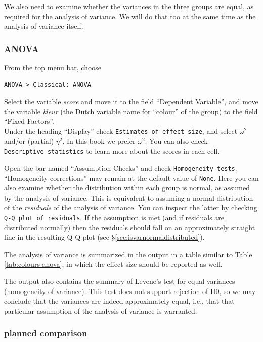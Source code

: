 \documentclass[
]{book}
\begin{document}
We also need to examine whether the variances in the three groups
are equal, as required for the analysis of variance. We will do that too at the same
time as the analysis of variance itself.

\subsubsection{ANOVA}\label{anova-1}

From the top menu bar, choose

\begin{verbatim}
ANOVA > Classical: ANOVA
\end{verbatim}

Select the variable \emph{score} and move it to the field ``Dependent Variable'', and move the variable \emph{kleur} (the Dutch variable name for ``colour'' of the group) to the field ``Fixed Factors''.\\
Under the heading ``Display'' check \texttt{Estimates\ of\ effect\ size}, and select \(\omega^2\) and/or (partial) \(\eta^2\). In this book we prefer \(\omega^2\).
You can also check \texttt{Descriptive\ statistics} to learn more about the scores in each cell.

Open the bar named ``Assumption Checks'' and check \texttt{Homogeneity\ tests}.
``Homogeneity corrections'' may remain at the default value of \texttt{None}.
Here you can also examine whether the distribution within each group is normal, as assumed by the analysis of variance. This is equivalent to assuming a normal distribution of the \emph{residuals} of the analysis of variance. You can inspect the latter by checking \texttt{Q-Q\ plot\ of\ residuals}. If the assumption is met (and if residuals are distributed normally) then the residuals should fall on an approximately straight line in the resulting Q-Q plot (see §\ref{sec:isvarnormaldistributed}).

The analysis of variance is summarized in the output in a table similar to Table \ref{tab:colours-anova}, in which the effect size should be reported as well.

The output also contains the summary of Levene's test for equal variances (homogeneity of variance). This test does not support rejection of H0, so we may conclude that the variances are indeed approximately equal, i.e., that that particular assumption of the analysis of variance is warranted.

\subsubsection{planned comparison}\label{planned-comparison-1}
\end{document}
